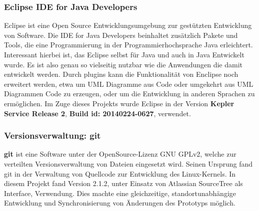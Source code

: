 \documentclass[12pt,a4paper,bibliography=totocnumbered,listof=totocnumbered]{scrartcl}
\begin{document}
\subsubsection{Eclipse IDE for Java Developers}
Eclipse ist eine Open Source Entwicklungsumgebung zur gestützten Entwicklung von Software. Die IDE for Java Developers beinhaltet zusätzlich Pakete und Tools, die eine Programmierung in der Programmierhochsprache Java erleichtert. Interessant hierbei ist, das Eclipse selbst für Java und auch in Java Entwickelt wurde. Es ist also genau so vielseitig nutzbar wie die Anwendungen die damit entwickelt werden. Durch plugins kann die Funktionalität von Enclipse noch erweitert werden, etwa um UML Diagramme aus Code oder umgekehrt aus UML Diagrammen Code zu erzeugen, oder um die Entwicklung in anderen Sprachen zu ermöglichen. Im Zuge dieses Projekts wurde Eclipse in der Version \textbf{Kepler Service Release 2}, \textbf{Build id: 20140224-0627}, verwendet.

\subsubsection{Versionsverwaltung: git}
\textbf{git} ist eine Software unter der OpenSource-Lizenz GNU GPLv2, welche zur verteilten Versionsverwaltung von Dateien eingesetzt wird. Seinen Ursprung fand git in der Verwaltung von Quellcode zur Entwicklung des Linux-Kernels. In diesem Projekt fand Version 2.1.2, unter Einsatz von Atlassian SourceTree als Interface, Verwendung. Dies machte eine gleichzeitige, standortunabhängige Entwicklung und Synchronisierung von Änderungen des Prototyps möglich.\\
\cite{31}
\end{document}
